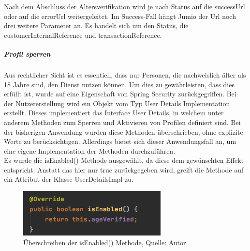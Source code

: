 Nach dem Abschluss der Altersverifikation wird je nach Status auf die successUrl oder auf die errorUrl weitergeleitet. Im Success-Fall hängt Jumio der Url noch drei weitere Parameter an. Es handelt sich um den Status, die customerInternalReference und transactionReference. \\

\subparagraph{Profil sperren}
Aus rechtlicher Sicht ist es essentiell, dass nur Personen, die nachweislich älter als 18 Jahre sind, den Dienst nutzen können. Um dies zu gewährleisten, dass dies erfüllt ist, wurde auf eine Eigenschaft von Spring Security zurückgegriffen. Bei der Nutzererstellung wird ein Objekt vom Typ User Details Implementation erstellt. Dieses implementiert das Interface User Details, in welchem unter anderem Methoden zum Sperren und Aktivieren von Profilen definiert sind. Bei der bisherigen Anwendung wurden diese Methoden überschrieben, ohne explizite Werte zu berücksichtigen. Allerdings bietet sich dieser Anwendungsfall an, um eine eigene Implementation der Methoden durchzuführen. \\
Es wurde die \glqq isEnabled()\grqq{} Methode ausgewählt, da diese dem gewünschten Effekt entspricht. Anstatt das hier nur true zurückgegeben wird, greift die Methode auf ein Attribut der Klasse UserDetailsImpl zu. 
 \begin{figure}[H]
	\centering
	\includegraphics[scale=0.6]{images/methodIsEnabled.PNG}
	\caption[Überschreiben der isEnabled() Methode]{Überschreiben der isEnabled() Methode, Quelle: Autor}
	\label{img: methodIsEnabled}
\end{figure} 

